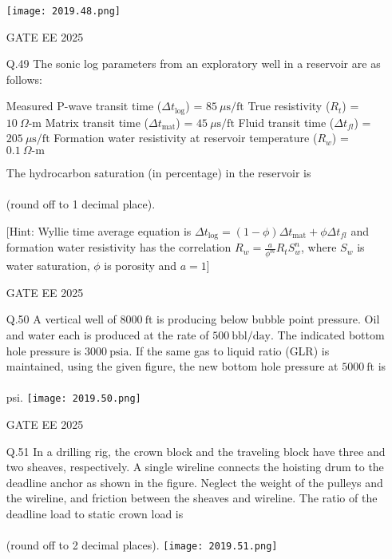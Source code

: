 \documentclass[journal]{IEEEtran}
\begin{document}
\begin{enumerate}[leftmargin=*,series=q]
\texttt{[image: 2019.48.png]}

GATE EE 2025
 \vspace{0.5cm} 

\item[Q.49] The sonic log parameters from an exploratory well in a reservoir are as follows:  

Measured P-wave transit time ($\Delta t_{\text{log}}$) = $85 \ \mu\text{s/ft}$  
True resistivity ($R_{t}$) = $10 \ \Omega\text{-m}$  
Matrix transit time ($\Delta t_{\text{mat}}$) = $45 \ \mu\text{s/ft}$  
Fluid transit time ($\Delta t_{fl}$) = $205 \ \mu\text{s/ft}$  
Formation water resistivity at reservoir temperature ($R_{w}$) = $0.1 \ \Omega\text{-m}$  

The hydrocarbon saturation (in percentage) in the reservoir is \\\\ (round off to 1 decimal place).  

[Hint: Wyllie time average equation is $\Delta t_{\text{log}} = (1 - \phi)\Delta t_{\text{mat}} + \phi \Delta t_{fl}$ and formation water resistivity has the correlation $R_{w} = \frac{a}{\phi^{m}} R_{t} S_{w}^{n}$, where $S_{w}$ is water saturation, $\phi$ is porosity and $a = 1$]  

GATE EE 2025
\vspace{0.5cm}
\item[Q.50] A vertical well of $8000 \ \text{ft}$ is producing below bubble point pressure. Oil and water each is produced at the rate of $500 \ \text{bbl/day}$. The indicated bottom hole pressure is $3000 \ \text{psia}$. If the same gas to liquid ratio (GLR) is maintained, using the given figure, the new bottom hole pressure at $5000 \ \text{ft}$ is \\\\ psi.  
\texttt{[image: 2019.50.png]}

GATE EE 2025
\vspace{0.5cm}
\item[Q.51] In a drilling rig, the crown block and the traveling block have three and two sheaves, respectively. A single wireline connects the hoisting drum to the deadline anchor as shown in the figure. Neglect the weight of the pulleys and the wireline, and friction between the sheaves and wireline. The ratio of the deadline load to static crown load is \\\\ (round off to 2 decimal places).  
\texttt{[image: 2019.51.png]}


\end{enumerate}
\end{document}
